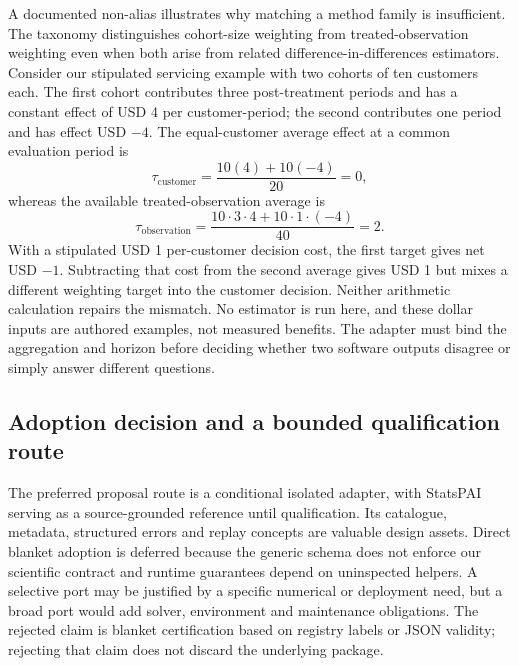 A documented non-alias illustrates why matching a method family is insufficient.
The taxonomy distinguishes cohort-size weighting from treated-observation
weighting even when both arise from related difference-in-differences estimators.
Consider our stipulated servicing example with two cohorts of ten customers
each. The first cohort contributes three post-treatment periods and has a
constant effect of USD 4 per customer-period; the second contributes one period
and has effect USD $-4$. The equal-customer average effect at a common evaluation
period is
\[
 \tau_{\mathrm{customer}}=\frac{10(4)+10(-4)}{20}=0,
\]
whereas the available treated-observation average is
\[
 \tau_{\mathrm{observation}}=\frac{10\cdot3\cdot4+10\cdot1\cdot(-4)}{40}=2.
\]
With a stipulated USD 1 per-customer decision cost, the first target gives
net USD $-1$. Subtracting that cost from the second average gives USD 1 but
mixes a different weighting target into the customer decision. Neither
arithmetic calculation repairs the mismatch. No estimator is run here, and
these dollar inputs are authored examples, not measured benefits. The adapter
must bind the aggregation and horizon before deciding whether two software
outputs disagree or simply answer different questions.
\citep{exec23_statspai_contract,exec23_statspai_contract_reference}

\subsection{Adoption decision and a bounded qualification route}
\label{exec23:statspai-contract-decision}
The preferred proposal route is a conditional isolated adapter, with StatsPAI
serving as a source-grounded reference until qualification. Its catalogue,
metadata, structured errors and replay concepts are valuable design assets.
Direct blanket adoption is deferred because the generic schema does not enforce
our scientific contract and runtime guarantees depend on uninspected helpers.
A selective port may be justified by a specific numerical or deployment need,
but a broad port would add solver, environment and maintenance obligations.
The rejected claim is blanket certification based on registry labels or JSON
validity; rejecting that claim does not discard the underlying package.
\citep{exec23_statspai_contract}

